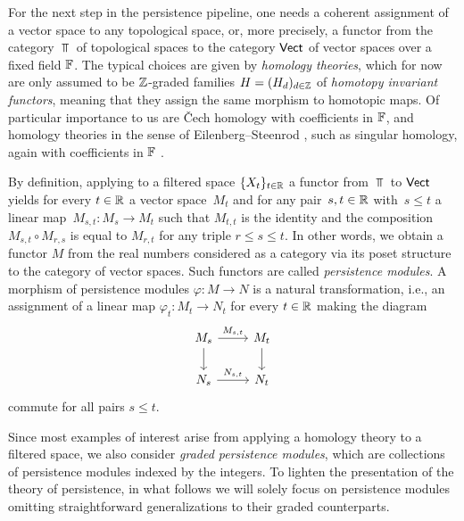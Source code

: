 For the next step in the persistence pipeline, one needs a coherent assignment of a vector space to any topological space, or, more precisely, a functor from the category $\Top$ of topological spaces to the category $\mathsf{Vect}$ of vector spaces over a fixed field $\mathbb{F}$.
The typical choices are given by \emph{homology theories}, which for now are only assumed to be $\mathbb{Z}$-graded families $H = (H_d)_{d \in \mathbb{Z}}$ of \emph{homotopy invariant functors}, meaning that they assign the same morphism to homotopic maps.
Of particular importance to us are \v{C}ech homology \cite[Section IX--X]{Eilenberg.1952} with coefficients in $\mathbb{F}$, and homology theories in the sense of Eilenberg--Steenrod \cite[Section I]{Eilenberg.1952}, such as singular homology, again with coefficients in $\mathbb{F}$ \cite{Eilenberg.1944}.

By definition, applying to a filtered space $\{X_t\}_{t \in \mathbb{R}}$ a functor from $\Top$ to $\mathsf{Vect}$ yields for every $t \in \mathbb{R}$ a vector space~$M_t$ and for any pair~$s, t \in \mathbb{R}$ with~$s \leq t$ a linear map~$M_{s,t} \colon M_s \to M_t$ such that $M_{t,t}$ is the identity and the composition $M_{s,t} \circ M_{r,s}$ is equal to $M_{r,t}$ for any triple $r \leq s \leq t$.
In other words, we obtain a functor $M$ from the real numbers considered as a category via its poset structure to the category of vector spaces.
Such functors are called \emph{persistence modules}.
A morphism of persistence modules $\varphi \colon M \to N$ is a natural transformation, i.e., an assignment of a linear map $\varphi_t \colon M_t \to N_t$ for every $t \in \mathbb{R}$ making the diagram
\begin{equation*}
\begin{tikzcd}
M_{s} \arrow[r, "M_{s,t}"] \arrow[d] & M_{t} \arrow[d] \\
N_{s} \arrow[r, "N_{s,t}"] & N_{t}
\end{tikzcd}
\end{equation*}
commute for all pairs $s \leq t$.

Since most examples of interest arise from applying a homology theory to a filtered space, we also consider \emph{graded persistence modules}, which are collections of persistence modules indexed by the integers.
To lighten the presentation of the theory of persistence, in what follows we will solely focus on persistence modules omitting straightforward generalizations to their graded counterparts.

